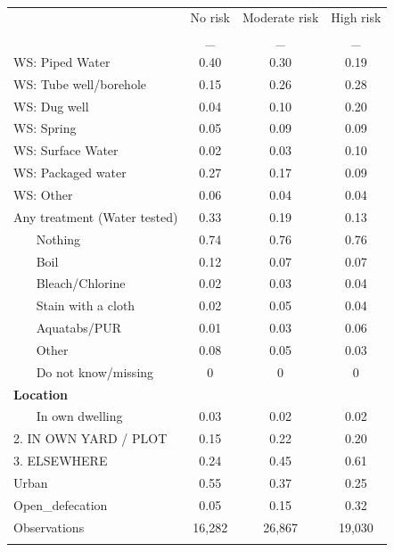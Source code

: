 \begin{table}[htbp]\centering
\def\sym#1{\ifmmode^{#1}\else\(^{#1}\)\fi}
\caption{ \label{}}
\begin{tabular}{l*{3}{c}}
\hline\hline
                    &\multicolumn{1}{c}{No risk}&\multicolumn{1}{c}{Moderate risk}&\multicolumn{1}{c}{High risk}\\
                    &           _&           _&           _\\
\hline
WS: Piped Water     &        0.40&        0.30&        0.19\\
WS: Tube well/borehole&        0.15&        0.26&        0.28\\
WS: Dug well        &        0.04&        0.10&        0.20\\
WS: Spring          &        0.05&        0.09&        0.09\\
WS: Surface Water   &        0.02&        0.03&        0.10\\
WS: Packaged water  &        0.27&        0.17&        0.09\\
WS: Other           &        0.06&        0.04&        0.04\\
Any treatment (Water tested)&        0.33&        0.19&        0.13\\
~~~ Nothing      &        0.74&        0.76&        0.76\\
~~~ Boil         &        0.12&        0.07&        0.07\\
~~~ Bleach/Chlorine&        0.02&        0.03&        0.04\\
~~~ Stain with a cloth&        0.02&        0.05&        0.04\\
~~~ Aquatabs/PUR &        0.01&        0.03&        0.06\\
~~~ Other        &        0.08&        0.05&        0.03\\
~~~ Do not know/missing&        0&        0&        0\\
\textbf{Location} \\\hline ~~~ In own dwelling&        0.03&        0.02&        0.02\\
2. IN OWN YARD / PLOT&        0.15&        0.22&        0.20\\
3. ELSEWHERE        &        0.24&        0.45&        0.61\\
Urban               &        0.55&        0.37&        0.25\\
Open_defecation     &        0.05&        0.15&        0.32\\
\hline
Observations        &      16,282&      26,867&      19,030\\
\hline\hline
\multicolumn{4}{p{0.87\linewidth}}{\footnotesize }\\
\end{tabular}
\end{table}
